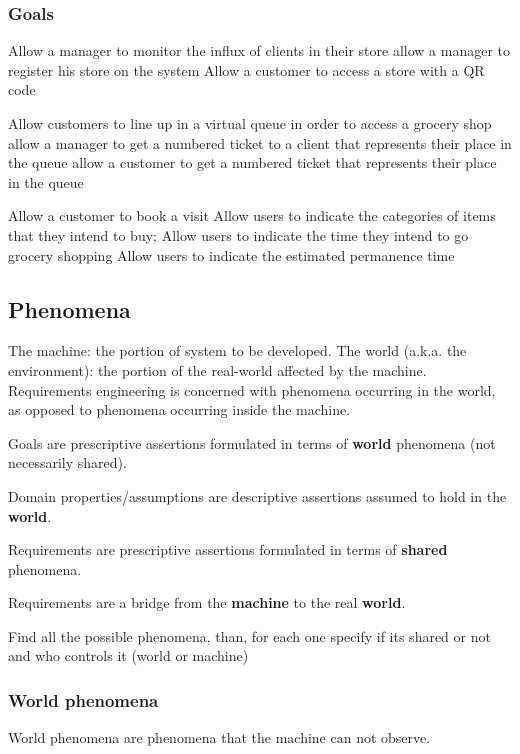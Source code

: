 \subsubsection{Goals}
\label{subsect:goals}

Allow a manager to monitor the influx of clients in their store 
allow a manager to register his store on the system
Allow a customer to access a store with a QR code

Allow customers to line up in a virtual queue in order to access a grocery shop
allow a manager to get a numbered ticket to a client that represents their place in the queue
allow a customer to get a numbered ticket that represents their place in the queue

Allow a customer to book a visit
Allow users to indicate the categories of items that they intend to buy;
Allow users to indicate the time they intend to go grocery shopping
Allow users to indicate the estimated permanence time 

\subsection{Phenomena}
\label{subsect:phenomena}

The machine: the portion of system to be developed.
The world (a.k.a. the environment): the portion of the real-world affected by the machine.
Requirements engineering is concerned with phenomena occurring in the world, as opposed to phenomena occurring inside the machine.

Goals are prescriptive assertions formulated in terms of \textbf{world} phenomena (not necessarily shared).

Domain properties/assumptions are descriptive assertions assumed to hold in the \textbf{world}.

Requirements are prescriptive assertions formulated in terms of \textbf{shared} phenomena.

Requirements are a bridge from the \textbf{machine} to the real \textbf{world}.

Find all the possible phenomena, than, for each one specify if its shared or not and who controls it (world or machine)

\subsubsection{World phenomena}
\label{subsubsect:worldphenomena}

World phenomena are phenomena that the machine can not observe.

